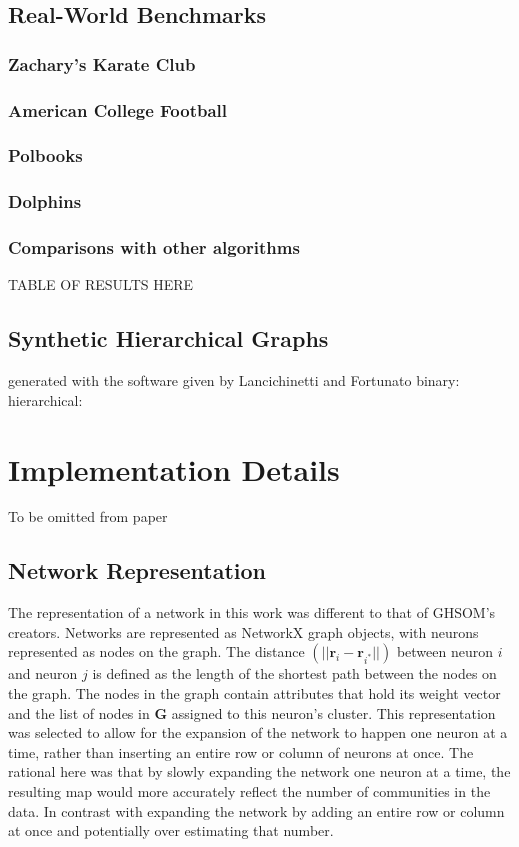 \documentclass{report}
\begin{document}
\section{Real-World Benchmarks}

\subsection{Zachary's Karate Club}
\cite{zachary1977information}
\subsection{American College Football}
\cite{girvan2002community}
\subsection{Polbooks}
\subsection{Dolphins}
\cite{lusseau2003emergent,lusseau2003bottlenose}
\subsection{Comparisons with other algorithms}

TABLE OF RESULTS HERE

\section{Synthetic Hierarchical Graphs}
generated with the software given by Lancichinetti and Fortunato binary: \cite{lancichinetti2009community}
hierarchical: \cite{lancichinetti2009detecting}
\chapter{Implementation Details}
To be omitted from paper
\section{Network Representation}
The representation of a network in this work was different to that of GHSOM's creators. Networks are represented as NetworkX graph objects, with neurons represented as nodes on the graph. The distance $(||\textbf{r}_i-\textbf{r}_{i^*}||)$ between neuron $i$ and neuron $j$  is defined as the length of the shortest path between the nodes on the graph. The nodes in the graph contain attributes that hold its weight vector and the list of nodes in $\textbf{G}$ assigned to this neuron's cluster. This representation was selected to allow for the expansion of the network to happen one neuron at a time, rather than inserting an entire row or column of neurons at once. The rational here was that by slowly expanding the network one neuron at a time, the resulting map would more accurately reflect the number of communities in the data. In contrast with expanding the network by adding an entire row or column at once and potentially over estimating that number. 
\end{document}
